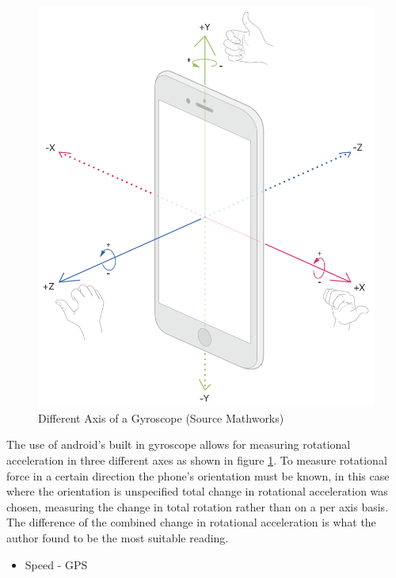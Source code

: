 \begin{figure}
\begin{center}
\includegraphics[scale = .1] {design/g.png}
\end{center}
\caption{Different Axis of a Gyroscope (Source Mathworks)}
\label{gyro}
\end{figure}


The use of android's built in gyroscope allows for measuring rotational acceleration in three different axes as shown in figure \ref{gyro}. To measure rotational force in a certain direction the phone's orientation must be known, in this case where the orientation is unspecified total change in rotational acceleration was chosen, measuring the change in total rotation rather than on a per axis basis. The difference of the combined change in rotational acceleration is what the author found to be the most suitable reading. 
\vspace{1cm}

\begin{itemize}
\item Speed - GPS
\end{itemize}

